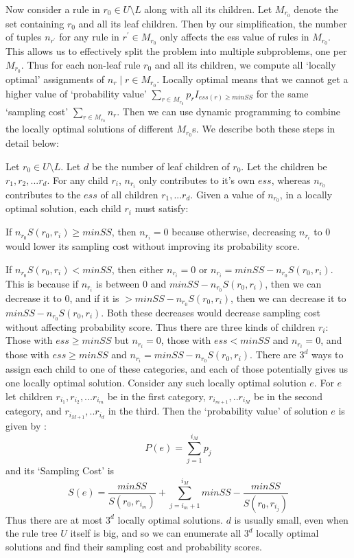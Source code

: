 Now consider a rule in $r_0 \in U \setminus L$ along with all its children. Let $M_{r_0}$ denote the set containing $r_0$ and all its leaf children. Then by our simplification, the number of tuples $n_{r^{\prime}}$ for any rule in $r^{\prime} \in M_{r_0}$ only affects the ess value of rules in $M_{r_0}$. This allows us to effectively split the problem into multiple subproblems, one per $M_{r_0}$. Thus for each non-leaf rule $r_0$ and all its children, we compute all `locally optimal' assignments of $n_r \mid r \in M_{r_0}$. Locally optimal means that we cannot get a higher value of `probability value' $\sum_{r \in M_{r_0}} p_rI_{ess(r) \geq minSS}$ for the same `sampling cost' $\sum_{r\in M_{r_0}} n_r$. Then we can use dynamic programming to combine the locally optimal solutions of different $M_{r_0}$s. We describe both these steps in detail below:

Let $r_0 \in U \setminus L$. Let $d$ be the number of leaf children of $r_0$. Let the children be $r_1, r_2, ... r_d$. For any child $r_i$, $n_{r_i}$ only contributes to it's own $ess$, whereas $n_{r_0}$ contributes to the $ess$ of all children $r_1, ... r_d$. Given a value of $n_{r_0}$, in a locally optimal solution, each child $r_i$ must satisfy:
\squishlist
\item If $n_{r_0}S(r_0, r_i) \geq minSS$, then $n_{r_i} = 0$ because otherwise, decreasing $n_{r_i}$ to $0$ would lower its sampling cost without improving its probability score. 
\item If $n_{r_0}S(r_0, r_i) < minSS$, then either $n_{r_i} = 0$ or $n_{r_i} = minSS - n_{r_0}S(r_0, r_i)$. This is because if $n_{r_i}$ is between $0$ and $minSS - n_{r_0}S(r_0, r_i)$, then we can decrease it to $0$, and if it is $> minSS - n_{r_0}S(r_0, r_i)$, then we can decrease it to $minSS - n_{r_0}S(r_0, r_i)$. Both these decreases would decrease sampling cost without affecting probability score. 
\squishend
Thus there are three kinds of children $r_i$: Those with $ess \geq minSS$ but $n_{r_i} = 0$, those with $ess < minSS$ and $n_{r_i} = 0$, and those with $ess \geq minSS$ and $n_{r_i} = minSS - n_{r_0}S(r_0, r_i)$. There are $3^d$ ways to assign each child to one of these categories, and each of those potentially gives us one locally optimal solution. Consider any such locally optimal solution $e$. For $e$ let children $r_{i_1}, r_{i_2}, ... r_{i_m}$ be in the first category, $r_{i_{m+1}}, .. r_{i_M}$ be in the second category, and $r_{i_{M+1}}, .. r_{i_d}$ in the third.  Then the `probability value' of solution $e$ is given by : 
$$P(e) = \sum_{j = 1}^{i_M}p_{j}$$
and its `Sampling Cost' is
$$S(e) = \frac{minSS}{S(r_0, r_{i_m})} + \sum_{j=i_m+1}^{i_M} minSS - \frac{minSS}{S(r_0, r_{i_j})}$$
Thus there are at most $3^d$ locally optimal solutions. $d$ is usually small, even when the rule tree $U$ itself is big, and so we can enumerate all $3^d$ locally optimal solutions and find their sampling cost and probability scores. 

